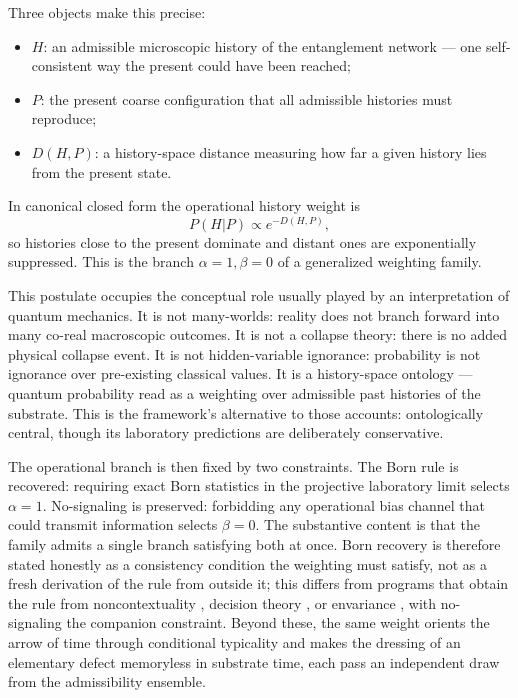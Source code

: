 \documentclass[11pt]{article}
\begin{document}
Three objects make this precise:
\begin{itemize}
\item $H$: an admissible microscopic history of the entanglement network --- one self-consistent way the present could have been reached;
\item $P$: the present coarse configuration that all admissible histories must reproduce;
\item $D(H,P)$: a history-space distance measuring how far a given history lies from the present state.
\end{itemize}
In canonical closed form the operational history weight is
\[
P(H|P)\propto e^{-D(H,P)},
\]
so histories close to the present dominate and distant ones are exponentially suppressed. This is the branch $\alpha=1,\beta=0$ of a generalized weighting family.

This postulate occupies the conceptual role usually played by an interpretation of quantum mechanics. It is not many-worlds: reality does not branch forward into many co-real macroscopic outcomes. It is not a collapse theory: there is no added physical collapse event. It is not hidden-variable ignorance: probability is not ignorance over pre-existing classical values. It is a history-space ontology --- quantum probability read as a weighting over admissible past histories of the substrate. This is the framework's alternative to those accounts: ontologically central, though its laboratory predictions are deliberately conservative.

The operational branch is then fixed by two constraints. The Born rule is recovered: requiring exact Born statistics in the projective laboratory limit selects $\alpha=1$. No-signaling is preserved: forbidding any operational bias channel that could transmit information selects $\beta=0$. The substantive content is that the family admits a single branch satisfying both at once. Born recovery is therefore stated honestly as a consistency condition the weighting must satisfy, not as a fresh derivation of the rule from outside it; this differs from programs that obtain the rule from noncontextuality \citep{Gleason1957}, decision theory \citep{Deutsch1999}, or envariance \citep{Zurek2005}, with no-signaling \citep{PopescuRohrlich1994} the companion constraint. Beyond these, the same weight orients the arrow of time through conditional typicality and makes the dressing of an elementary defect memoryless in substrate time, each pass an independent draw from the admissibility ensemble.
\end{document}
